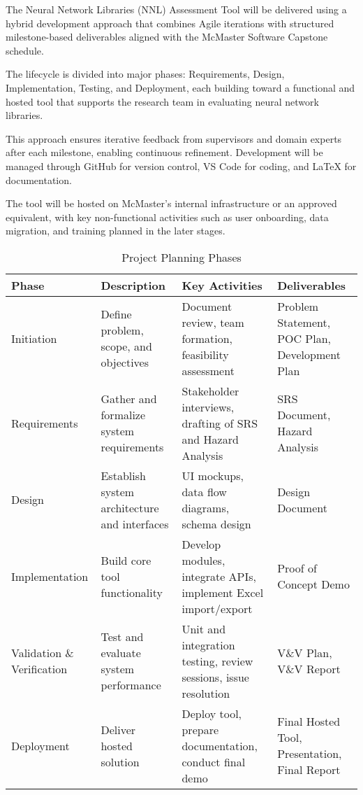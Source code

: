 \documentclass[12pt]{article}
\begin{document}
The Neural Network Libraries (NNL) Assessment Tool will be delivered using a hybrid development approach that combines Agile iterations with structured milestone-based deliverables aligned with the McMaster Software Capstone schedule.

The lifecycle is divided into major phases: Requirements, Design, Implementation, Testing, and Deployment, each building toward a functional and hosted tool that supports the research team in evaluating neural network libraries.

This approach ensures iterative feedback from supervisors and domain experts after each milestone, enabling continuous refinement. Development will be managed through GitHub for version control, VS Code for coding, and LaTeX for documentation.

The tool will be hosted on McMaster’s internal infrastructure or an approved equivalent, with key non-functional activities such as user onboarding, data migration, and training planned in the later stages.

\begin{table}[h!]
\centering
\caption{Project Planning Phases}
\begin{tabularx}{\textwidth}{lXlX}
\toprule
\textbf{Phase} & \textbf{Description} & \textbf{Key Activities} & \textbf{Deliverables} \\
\midrule
Initiation & Define problem, scope, and objectives & Document review, team formation, feasibility assessment & Problem Statement, POC Plan, Development Plan \\
Requirements & Gather and formalize system requirements & Stakeholder interviews, drafting of SRS and Hazard Analysis & SRS Document, Hazard Analysis \\
Design & Establish system architecture and interfaces & UI mockups, data flow diagrams, schema design & Design Document \\
Implementation & Build core tool functionality & Develop modules, integrate APIs, implement Excel import/export & Proof of Concept Demo \\
Validation \& Verification & Test and evaluate system performance & Unit and integration testing, review sessions, issue resolution & V\&V Plan, V\&V Report \\
Deployment & Deliver hosted solution & Deploy tool, prepare documentation, conduct final demo & Final Hosted Tool, Presentation, Final Report \\
\bottomrule
\end{tabularx}
\end{table}
\end{document}
